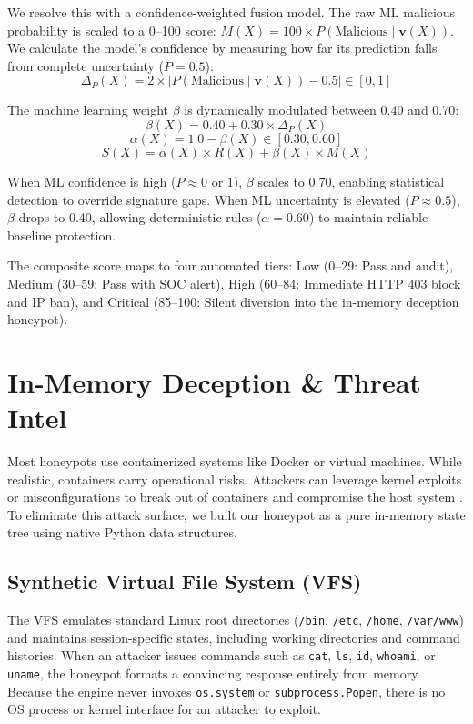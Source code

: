 \documentclass[conference]{IEEEtran}
\begin{document}
We resolve this with a confidence-weighted fusion model. The raw ML malicious probability is scaled to a 0–100 score: $M(X) = 100 \times P(\text{Malicious} \mid \mathbf{v}(X))$. We calculate the model's confidence by measuring how far its prediction falls from complete uncertainty ($P = 0.5$):
\begin{equation}
\Delta_P(X) = 2 \times | P(\text{Malicious} \mid \mathbf{v}(X)) - 0.5 | \in [0, 1]
\end{equation}

The machine learning weight $\beta$ is dynamically modulated between 0.40 and 0.70:
\begin{equation}
\beta(X) = 0.40 + 0.30 \times \Delta_P(X)
\end{equation}
\begin{equation}
\alpha(X) = 1.0 - \beta(X) \in [0.30, 0.60]
\end{equation}
\begin{equation}
S(X) = \alpha(X) \times R(X) + \beta(X) \times M(X)
\end{equation}

When ML confidence is high ($P \approx 0$ or $1$), $\beta$ scales to 0.70, enabling statistical detection to override signature gaps. When ML uncertainty is elevated ($P \approx 0.5$), $\beta$ drops to 0.40, allowing deterministic rules ($\alpha = 0.60$) to maintain reliable baseline protection.

The composite score maps to four automated tiers: Low (0--29: Pass and audit), Medium (30--59: Pass with SOC alert), High (60--84: Immediate HTTP 403 block and IP ban), and Critical (85--100: Silent diversion into the in-memory deception honeypot).

\section{In-Memory Deception \& Threat Intel}
Most honeypots use containerized systems like Docker or virtual machines. While realistic, containers carry operational risks. Attackers can leverage kernel exploits or misconfigurations to break out of containers and compromise the host system \cite{spitzner2003}. To eliminate this attack surface, we built our honeypot as a pure in-memory state tree using native Python data structures.

\subsection{Synthetic Virtual File System (VFS)}
The VFS emulates standard Linux root directories (\texttt{/bin}, \texttt{/etc}, \texttt{/home}, \texttt{/var/www}) and maintains session-specific states, including working directories and command histories. When an attacker issues commands such as \texttt{cat}, \texttt{ls}, \texttt{id}, \texttt{whoami}, or \texttt{uname}, the honeypot formats a convincing response entirely from memory. Because the engine never invokes \texttt{os.system} or \texttt{subprocess.Popen}, there is no OS process or kernel interface for an attacker to exploit.
\end{document}
